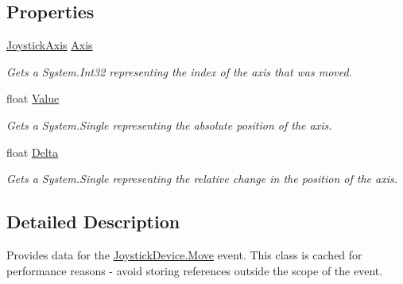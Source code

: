 \subsection*{Properties}
\begin{DoxyCompactItemize}
\item 
\hyperlink{namespace_open_t_k_1_1_input_ab565c2e944f2be911b6b39e1d5ee4fda}{Joystick\-Axis} \hyperlink{class_open_t_k_1_1_input_1_1_joystick_move_event_args_a25730ccb923e12a9890e75697bdba6a2}{Axis}
\begin{DoxyCompactList}\small\item\em Gets a System.\-Int32 representing the index of the axis that was moved. \end{DoxyCompactList}\item 
float \hyperlink{class_open_t_k_1_1_input_1_1_joystick_move_event_args_a8944831f91ed3f63c6ac77472e42c2a2}{Value}
\begin{DoxyCompactList}\small\item\em Gets a System.\-Single representing the absolute position of the axis. \end{DoxyCompactList}\item 
float \hyperlink{class_open_t_k_1_1_input_1_1_joystick_move_event_args_a868d586a5500d5729539f77e0702deff}{Delta}
\begin{DoxyCompactList}\small\item\em Gets a System.\-Single representing the relative change in the position of the axis. \end{DoxyCompactList}\end{DoxyCompactItemize}


\subsection{Detailed Description}
Provides data for the \hyperlink{class_open_t_k_1_1_input_1_1_joystick_device_ad9dcc4f6506c543d16e326c7ee08da39}{Joystick\-Device.\-Move} event. This class is cached for performance reasons -\/ avoid storing references outside the scope of the event. 



